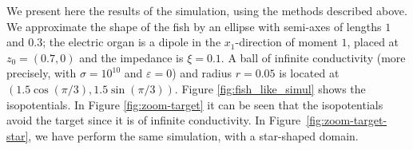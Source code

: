 We present here the results of the simulation, using the methods described above.
We approximate the shape of the fish by an ellipse with semi-axes of
lengths $1$ and $0.3$; the electric organ is a dipole in the
$x_1$-direction of moment $1$, placed at $z_{0}=(0.7,0)$ and the
impedance is $\xi=0.1$. A ball of infinite conductivity (more
precisely, with $\sigma=10^{10}$ and $\varepsilon=0$) and radius
$r=0.05$ is located at $(1.5\cos(\pi/3),1.5\sin(\pi/3))$. Figure
\ref{fig:fish_like_simul} shows the isopotentials. In Figure
\ref{fig:zoom-target} it can be seen that the
isopotentials avoid the target since it is of infinite
conductivity. In Figure~\ref{fig:zoom-target-star}, we have perform the
same simulation, with a star-shaped domain.

    
